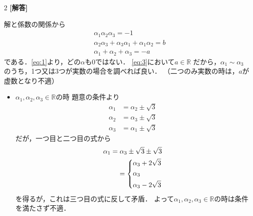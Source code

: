 \documentclass[../../main.tex]{subfiles}
\begin{document}
\setcounter{equation}{0}
\begin{oframed}
  
\end{oframed}
\setlength{\columnseprule}{0.4pt}
\begin{multicols}{2}
  {\bf [解答]}

  解と係数の関係から
  \begin{align}
    & \alpha_1 \alpha_2 \alpha_3                                 = -1 \label{eq:1} \\
    & \alpha_2 \alpha_3 + \alpha_3 \alpha_1 + \alpha_1 \alpha_2  = b  \label{eq:2} \\
    & \alpha_1 + \alpha_2 + \alpha_3                             = -a \label{eq:3}
  \end{align}
  である．\cref{eq:1}より，どの$\alpha$も$0$ではない．
  \cref{eq:3}において$a \in \mathbb{R}$ だから，$\alpha_1 \sim \alpha_3$ のうち，1つ又は3つが実数の場合を調べれば良い．
  （二つのみ実数の時は，$a$が虚数となり不適）

  \begin{itemize}
    \item[$1$] $ \alpha_1, \alpha_2, \alpha_3 \in \mathbb{R} $の時
      題意の条件より
      \begin{align}
        \alpha_1 & = \alpha_2 \pm \sqrt{3} \\
        \alpha_2 & = \alpha_3 \pm \sqrt{3} \\
        \alpha_3 & = \alpha_1 \pm \sqrt{3}
      \end{align}
      だが，一つ目と二つ目の式から
      \begin{align}
        \alpha_1 = \alpha_3 \pm \sqrt{3} \pm \sqrt{3} \\
        =
        \begin{dcases}
          \alpha_3 + 2\sqrt{3} \\
          \alpha_3 \\
          \alpha_3 - 2\sqrt{3}
        \end{dcases}
      \end{align}
      を得るが，これは三つ目の式に反して矛盾．
      よって$ \alpha_1, \alpha_2, \alpha_3 \in \mathbb{R} $の時は条件を満たさず不適．


\end{itemize}
\end{multicols}
\end{document}
